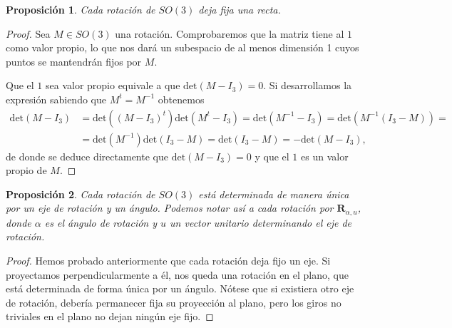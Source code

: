 \documentclass{article}
\theoremstyle{plain}
\newtheorem{proposition}{Proposición}
\theoremstyle{definition}
\theoremstyle{remark}
\begin{document}
\begin{proposition}
  Cada rotación de $SO(3)$ deja fija una recta.
\end{proposition}
\begin{proof}
  Sea $ M \in SO(3)$ una rotación. Comprobaremos que la matriz tiene
  al $1$ como valor propio, lo que nos dará un subespacio de al menos
  dimensión 1 cuyos puntos se mantendrán fijos por $M$.

  Que el $1$ sea valor propio equivale a que $\mathrm{det}(M-I_3)=0$.
  Si desarrollamos la expresión sabiendo que $M^t = M^{-1}$ obtenemos
  \[\begin{aligned}
    \mathrm{det}(M - I_3) &=
    \mathrm{det}((M - I_3)^t) \mathrm{det}(M^t - I_3) =
    \mathrm{det}(M^{-1} - I_3) =
    \mathrm{det}(M^{-1}(I_3 - M)) =\\
    &= \mathrm{det}(M^{-1}) \mathrm{det}(I_3 - M) =
    \mathrm{det}(I_3 - M) = -\mathrm{det}(M - I_3),
  \end{aligned}\]
  de donde se deduce directamente que $\mathrm{det}(M - I_3) = 0$ y que el $1$
  es un valor propio de $M$.
\end{proof}

\begin{proposition}
  Cada rotación de $SO(3)$ está determinada de manera única por un
  eje de rotación y un ángulo. Podemos notar así a cada rotación por
  $\mathbf{R}_{\alpha,u}$, donde $\alpha$ es el ángulo de rotación y $u$
  un vector unitario determinando el eje de rotación.
\end{proposition}
\begin{proof}
  Hemos probado anteriormente que cada rotación deja fijo un eje. Si
  proyectamos perpendicularmente a él, nos queda una rotación en el
  plano, que está determinada de forma única por un ángulo. Nótese que
  si existiera otro eje de rotación, debería permanecer fija su
  proyección al plano, pero los giros no triviales en el plano no
  dejan ningún eje fijo.
\end{proof}
\end{document}
